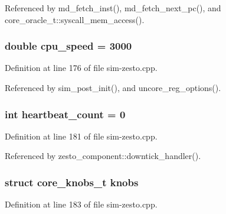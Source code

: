 Referenced by md\_\-fetch\_\-inst(), md\_\-fetch\_\-next\_\-pc(), and core\_\-oracle\_\-t::syscall\_\-mem\_\-access().
\subsubsection[{cpu\_\-speed}]{\setlength{\rightskip}{0pt plus 5cm}double {\bf cpu\_\-speed} = 3000}\label{sim-zesto_8cpp_ebb0be7596a98356724d9653c17116c2}




Definition at line 176 of file sim-zesto.cpp.

Referenced by sim\_\-post\_\-init(), and uncore\_\-reg\_\-options().
\subsubsection[{heartbeat\_\-count}]{\setlength{\rightskip}{0pt plus 5cm}int {\bf heartbeat\_\-count} = 0}\label{sim-zesto_8cpp_af9443448449d3e516d9e748c4fbb6bf}




Definition at line 181 of file sim-zesto.cpp.

Referenced by zesto\_\-component::downtick\_\-handler().
\subsubsection[{knobs}]{\setlength{\rightskip}{0pt plus 5cm}struct {\bf core\_\-knobs\_\-t} {\bf knobs}}\label{sim-zesto_8cpp_89a180011adecec49b08c8ef843388fa}




Definition at line 183 of file sim-zesto.cpp.

